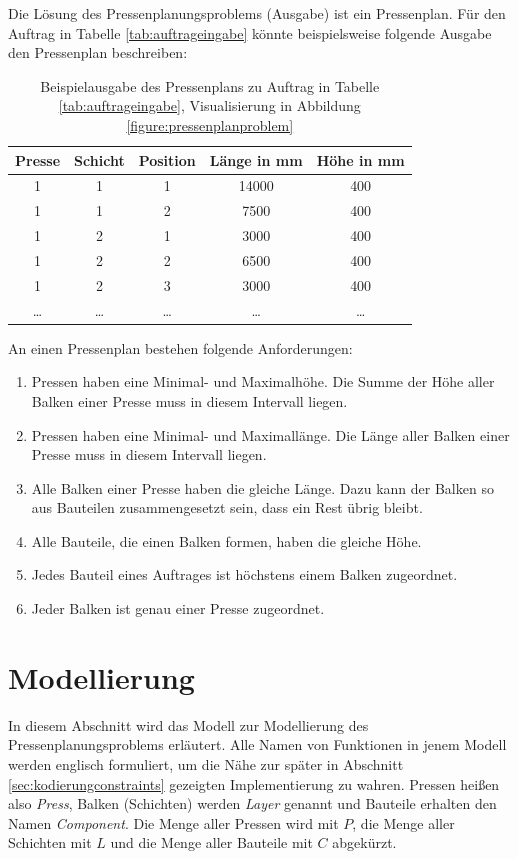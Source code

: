 Die Lösung des Pressenplanungsproblems (Ausgabe) ist ein Pressenplan.
Für den Auftrag in Tabelle \ref{tab:auftrageingabe} könnte beispielsweise folgende Ausgabe den Pressenplan beschreiben:

\begin{table}[H]
    \centering
    \begin{tabular}{|c|c|c|c|c|}
        \hline
        \textbf{Presse} & \textbf{Schicht} & \textbf{Position} & \textbf{Länge in mm} & \textbf{Höhe in mm} \\
        \hline
        1 & 1 & 1 & 14000 & 400 \\
        1 & 1 & 2 & 7500 & 400 \\
        1 & 2 & 1 & 3000 & 400 \\
        1 & 2 & 2 & 6500 & 400 \\
        1 & 2 & 3 & 3000 & 400 \\
        \ldots & \ldots & \ldots & \ldots & \ldots \\
        \hline
    \end{tabular}
    \caption{Beispielausgabe des Pressenplans zu Auftrag in Tabelle \ref{tab:auftrageingabe}, Visualisierung in Abbildung \ref{figure:pressenplanproblem}}
    \label{tab:auftragausgabe}
\end{table}

An einen Pressenplan bestehen folgende Anforderungen:
\begin{enumerate}
    \item Pressen haben eine Minimal- und Maximalhöhe. Die Summe der Höhe aller Balken einer Presse muss in diesem Intervall liegen.
    \item Pressen haben eine Minimal- und Maximallänge. Die Länge aller Balken einer Presse muss in diesem Intervall liegen.
    \item Alle Balken einer Presse haben die gleiche Länge. Dazu kann der Balken so aus Bauteilen zusammengesetzt sein, dass ein Rest übrig bleibt.
    \item Alle Bauteile, die einen Balken formen, haben die gleiche Höhe.
    \item Jedes Bauteil eines Auftrages ist höchstens einem Balken zugeordnet.
    \item Jeder Balken ist genau einer Presse zugeordnet.
\end{enumerate}

\section{Modellierung}
\label{sec:modellierung}
In diesem Abschnitt wird das Modell zur Modellierung des Pressenplanungsproblems erläutert.
Alle Namen von Funktionen in jenem Modell werden englisch formuliert, um die Nähe zur später in Abschnitt \ref{sec:kodierungconstraints} gezeigten Implementierung zu wahren.
Pressen heißen also \textit{Press}, Balken (Schichten) werden \textit{Layer} genannt und Bauteile erhalten den Namen \textit{Component}.
Die Menge aller Pressen wird mit $P$, die Menge aller Schichten mit $L$ und die Menge aller Bauteile mit $C$ abgekürzt.


